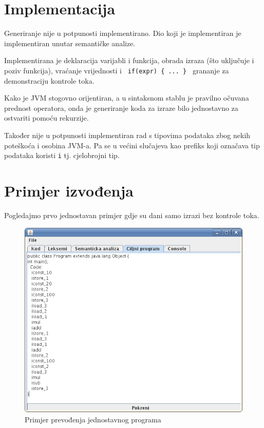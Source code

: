 \section{Implementacija}

Generiranje nije u potpunosti implementirano. Dio koji je implementiran je implementiran unutar semantičke analize.

Implementirana je deklaracija varijabli i funkcija, obrada izraza (što uključuje i poziv funkcija), vraćanje vrijednosti i
\texttt{ if(expr) \{ ... \} } grananje za demonstraciju kontrole toka.

Kako je JVM stogovno orijentiran, a u sintaksnom stablu je pravilno očuvana prednost operatora, onda je
generiranje koda za izraze bilo jednostavno za ostvariti pomoću rekurzije. 

Također nije u potpunosti implementiran rad s tipovima podataka zbog nekih poteškoća i osobina JVM-a. Pa se u većini
slučajeva kao prefiks koji označava tip podataka koristi \texttt{i} tj. cjelobrojni tip.
\pagebreak
\section{Primjer izvođenja}

Pogledajmo prvo jednostavan primjer gdje su dani samo izrazi bez kontrole toka.



\begin{figure}[H]
  \centering
    \includegraphics[width=13cm]{primjer-generiranje2}
  \caption{Primjer prevođenja jednostavnog programa}
\end{figure}

